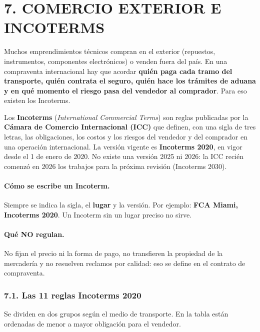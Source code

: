\section*{7. COMERCIO EXTERIOR E INCOTERMS}

Muchos emprendimientos técnicos compran en el exterior (repuestos, instrumentos,
componentes electrónicos) o venden fuera del país. En una compraventa internacional hay
que acordar \textbf{quién paga cada tramo del transporte, quién contrata el seguro, quién
hace los trámites de aduana y en qué momento el riesgo pasa del vendedor al comprador}.
Para eso existen los Incoterms.

\begin{recuadro}
Los \textbf{Incoterms} (\textit{International Commercial Terms}) son reglas publicadas por la
\textbf{Cámara de Comercio Internacional (ICC)} que definen, con una sigla de tres letras,
las obligaciones, los costos y los riesgos del vendedor y del comprador en una operación
internacional. La versión vigente es \textbf{Incoterms 2020}, en vigor desde el 1 de enero
de 2020. No existe una versión 2025 ni 2026: la ICC recién comenzó en 2026 los trabajos
para la próxima revisión (Incoterms 2030).
\end{recuadro}

\paragraph*{Cómo se escribe un Incoterm.}
Siempre se indica la sigla, el \textbf{lugar} y la versión. Por ejemplo:
\textbf{FCA Miami, Incoterms 2020}. Un Incoterm sin un lugar preciso no sirve.

\paragraph*{Qué NO regulan.}
No fijan el precio ni la forma de pago, no transfieren la propiedad de la mercadería y no
resuelven reclamos por calidad: eso se define en el contrato de compraventa.

\subsubsection*{7.1. Las 11 reglas Incoterms 2020}
Se dividen en dos grupos según el medio de transporte. En la tabla están ordenadas de menor
a mayor obligación para el vendedor.

